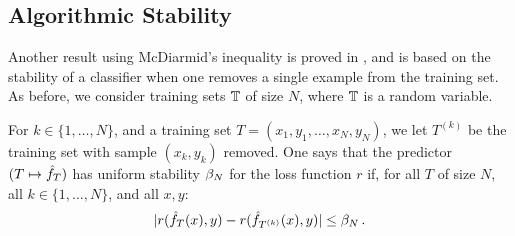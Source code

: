  


%

\subsection{Algorithmic Stability}
Another result using McDiarmid's inequality is pro\-ved in \citet{bousquet2002stability}, and is based on the stability of a  classifier when one removes a single example from the training set. As before, we consider training sets ${\mathbb T}$ of size $N$, where ${\mathbb T}$ is a random variable.

For $k\in \{1, \ldots, N\}$, and a training set $T = (x_1, y_1, \ldots, x_N, y_N)$, we let $T^{(k)}$ be the training set with sample $(x_k, y_k)$ removed. One says that the predictor $(T\mapsto {\hat{f}}_T)$ has uniform stability $\beta_N$ for the loss function $r$ if, for all $T$ of size $N$, all $k\in \{1, \ldots, N\}$, and all $x,y$:
\begin{equation}
\label{eq:unif.stab}
|r({\hat{f}}_T(x), y) - r({\hat{f}}_{T^{(k)}} (x), y)| \leq \beta_N\,.
\end{equation}

